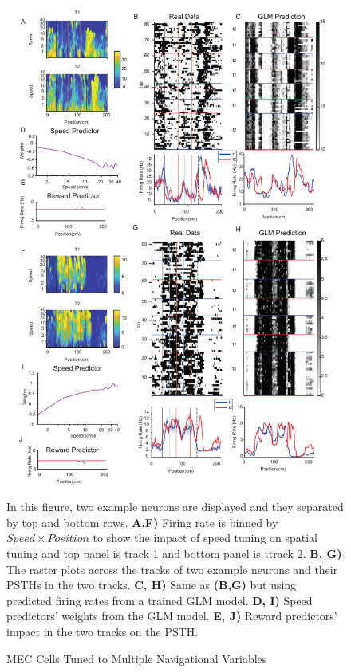 \begin{figure}
    \centering
    \includegraphics[width=1\linewidth]{figures//Chapter 5 MEC/fig3_multiple_navigational_variables.pdf}
    \caption{MEC Cells Tuned to Multiple Navigational Variables}
    
    \label{fig:placeholder}
\medskip
\small
In this figure, two example neurons are displayed and they separated by top and bottom rows. \textbf{A,F)} Firing rate is binned by \(Speed \times Position\) to show the impact of speed tuning on spatial tuning and top panel is track 1 and bottom panel is ttrack 2. \textbf{B, G)} The raster plots across the tracks of two example neurons and their PSTHs in the two tracks. \textbf{C, H)} Same as \textbf{(B,G)} but using predicted firing rates from a trained GLM model. \textbf{D, I)} Speed predictors' weights from the GLM model. \textbf{E, J)} Reward predictors' impact in the two tracks on the PSTH.
\end{figure}



